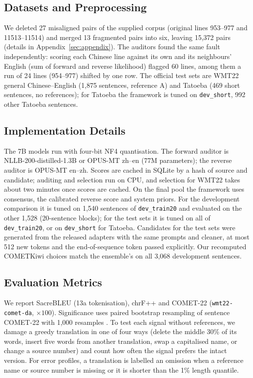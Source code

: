 \documentclass[11pt]{article}
\begin{document}
\subsection{Datasets and Preprocessing}
\label{subsec:datasets}
We deleted 27 misaligned pairs of the supplied corpus (original lines 953--977 and 11513--11514) and merged 13 fragmented pairs into six, leaving 15,372 pairs (details in Appendix~\ref{sec:appendix}). The auditors found the same fault independently: scoring each Chinese line against its own and its neighbours' English (sum of forward and reverse likelihood) flagged 60 lines, among them a run of 24 lines (954--977) shifted by one row. The official test sets are WMT22 general Chinese--English (1,875 sentences, reference A) and Tatoeba (469 short sentences, no references); for Tatoeba the framework is tuned on \texttt{dev\_short}, 992 other Tatoeba sentences.

\subsection{Implementation Details}
\label{subsec:implementation}
The 7B models run with four-bit NF4 quantisation. The forward auditor is NLLB-200-distilled-1.3B or OPUS-MT zh--en (77M parameters); the reverse auditor is OPUS-MT en--zh. Scores are cached in SQLite by a hash of source and candidate; auditing and selection run on CPU, and selection for WMT22 takes about two minutes once scores are cached. On the final pool the framework uses consensus, the calibrated reverse score and system priors. For the development comparison it is tuned on 1,540 sentences of \texttt{dev\_train20} and evaluated on the other 1,528 (20-sentence blocks); for the test sets it is tuned on all of \texttt{dev\_train20}, or on \texttt{dev\_short} for Tatoeba. Candidates for the test sets were generated from the released adapters with the same prompts and cleaner, at most 512 new tokens and the end-of-sequence token passed explicitly. Our recomputed COMETKiwi choices match the ensemble's on all 3,068 development sentences.

\subsection{Evaluation Metrics}
\label{subsec:metrics}
We report SacreBLEU (13a tokenisation), chrF++ and COMET-22 (\texttt{wmt22-comet-da}, $\times 100$). Significance uses paired bootstrap resampling of sentence COMET-22 with 1,000 resamples \citep{koehn-2004-statistical}. To test each signal without references, we damage a greedy translation in one of four ways (delete the middle 30\% of its words, insert five words from another translation, swap a capitalised name, or change a source number) and count how often the signal prefers the intact version. For error profiles, a translation is labelled an omission when a reference name or source number is missing or it is shorter than the 1\% length quantile.
\end{document}
